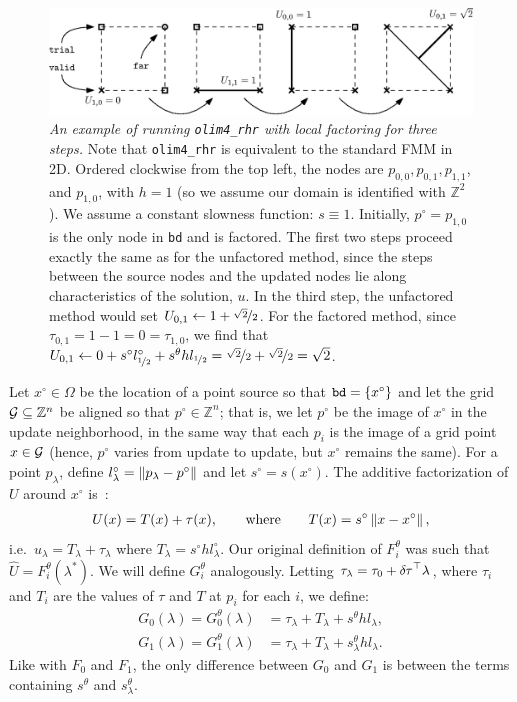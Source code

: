 \documentclass[smallcondensed]{svjour3}
\begin{document}
\begin{figure}
  \centering
  \includegraphics[width=\linewidth]{factoring-example.eps}
  \caption{\emph{An example of running \texttt{olim4\_rhr} with local
      factoring for three steps.} Note that \texttt{olim4\_rhr} is
    equivalent to the standard FMM in 2D. Ordered clockwise from the
    top left, the nodes are $p_{0, 0}, p_{0, 1}, p_{1, 1}$, and
    $p_{1, 0}$, with $h = 1$ (so we assume our domain is identified
    with $\mathbb{Z}^2$). We assume a constant slowness function:
    $s \equiv 1$. Initially, $p^\circ = p_{1, 0}$ is the only node in
    \texttt{bd} and is factored. The first two steps proceed exactly
    the same as for the unfactored method, since the steps between the
    source nodes and the updated nodes lie along characteristics of
    the solution, $u$. In the third step, the unfactored method would
    set $U_{0,1} \gets 1 + \nicefrac{\sqrt{2}}{2}$. For the factored
    method, since $\tau_{0,1} = 1 - 1 = 0 = \tau_{1,0}$, we find that
    $U_{0,1} \gets 0 + s^\circ l^\circ_{\nicefrac{1}{2}} + s^\theta h
    l_{\nicefrac{1}{2}} = \nicefrac{\sqrt{2}}{2} +
    \nicefrac{\sqrt{2}}{2} = \sqrt{2}$.}\label{fig:factoring-example}
\end{figure}

Let $x^\circ \in \Omega$ be the location of a point source so that
$\texttt{bd} = \left\{x^\circ\right\}$ and let the grid
$\mathcal{G} \subseteq \mathbb{Z}^n$ be aligned so that
$p^\circ \in \mathbb{Z}^n$; that is, we let $p^\circ$ be the image of
$x^\circ$ in the update neighborhood, in the same way that each $p_i$
is the image of a grid point $x \in \mathcal{G}$ (hence, $p^\circ$ varies
from update to update, but $x^\circ$ remains the same). For a point
$p_\lambda$, define $l^\circ_\lambda = \left\|p_\lambda - p^\circ\right\|$ and
let $s^\circ = s(x^\circ)$. The additive factorization of $U$ around
$x^\circ$ is~\cite{luo2012fast,qi2018corner}:
\begin{align}
  U(x) = T(x) + \tau(x), \qquad \text{where} \qquad T(x) = s^\circ \left\|x - x^\circ\right\|,
\end{align}
i.e.\ $u_\lambda = T_\lambda + \tau_\lambda$ where
$T_\lambda = s^\circ h l^\circ_\lambda$. Our original definition of
$F_i^\theta$ was such that $\hat{U} = F_i^\theta(\lambda^*)$. We will
define $G_i^\theta$ analogously. Letting
$\tau_\lambda = \tau_0 + {\delta \hspace{-0.05em} \tau}^\top \lambda$, where $\tau_i$ and
$T_i$ are the values of $\tau$ and $T$ at $p_i$ for each $i$, we
define:
\begin{align}
  \label{eq:Gi}
  G_0(\lambda) = G_0^\theta(\lambda) &= \tau_\lambda + T_\lambda + s^\theta h l_\lambda, \\
  G_1(\lambda) = G_1^\theta(\lambda) &= \tau_\lambda + T_\lambda + s^\theta_\lambda h l_\lambda.
\end{align}
Like with $F_0$ and $F_1$, the only difference between
$G_0$ and $G_1$ is between the terms containing
$s^\theta$ and $s^\theta_\lambda$.
\end{document}
